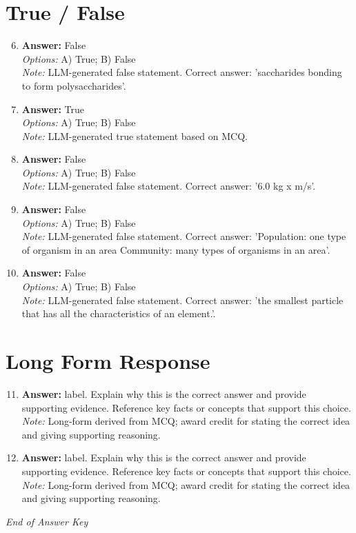 \documentclass[12pt]{article}
\begin{document}
\section*{True / False}
\begin{enumerate}[label=\arabic*.]
\setcounter{enumi}{5}
\item \textbf{Answer:} False
\\ \textit{Options:} A) True; B) False
\\ \textit{Note:} LLM-generated false statement. Correct answer: 'saccharides bonding to form polysaccharides'.
\item \textbf{Answer:} True
\\ \textit{Options:} A) True; B) False
\\ \textit{Note:} LLM-generated true statement based on MCQ.
\item \textbf{Answer:} False
\\ \textit{Options:} A) True; B) False
\\ \textit{Note:} LLM-generated false statement. Correct answer: '6.0 kg x m/s'.
\item \textbf{Answer:} False
\\ \textit{Options:} A) True; B) False
\\ \textit{Note:} LLM-generated false statement. Correct answer: 'Population: one type of organism in an area Community: many types of organisms in an area'.
\item \textbf{Answer:} False
\\ \textit{Options:} A) True; B) False
\\ \textit{Note:} LLM-generated false statement. Correct answer: 'the smallest particle that has all the characteristics of an element.'.
\end{enumerate}

\section*{Long Form Response}
\begin{enumerate}[label=\arabic*.]
\setcounter{enumi}{10}
\item \textbf{Answer:} label. Explain why this is the correct answer and provide supporting evidence. Reference key facts or concepts that support this choice.
\\ \textit{Note:} Long-form derived from MCQ; award credit for stating the correct idea and giving supporting reasoning.
\item \textbf{Answer:} label. Explain why this is the correct answer and provide supporting evidence. Reference key facts or concepts that support this choice.
\\ \textit{Note:} Long-form derived from MCQ; award credit for stating the correct idea and giving supporting reasoning.
\end{enumerate}

\vfill
\noindent\textit{End of Answer Key}
\end{document}
